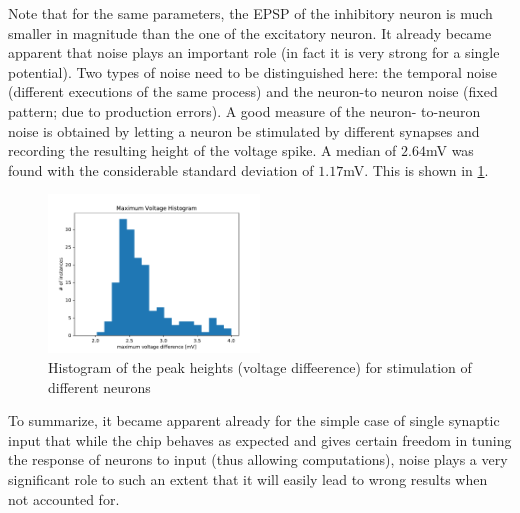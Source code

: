 \documentclass[a4paper,twocolumn]{article}
\begin{document}
Note that for the same parameters,  the EPSP of the inhibitory neuron is much
smaller in magnitude than the one of the excitatory neuron.
It already became apparent that noise plays an important role (in fact it is very
strong for a single potential).  Two types of noise need to be distinguished here:
the temporal noise (different executions of the same process) and the neuron-to
neuron noise (fixed pattern; due to production errors).  A good measure of the neuron-
to-neuron noise is obtained by letting a neuron be stimulated by different synapses
and recording the resulting height of the voltage spike.  A median of $2.64$mV was
found with the considerable standard deviation of $1.17$mV.  This is shown in
\ref{MaxVoltHisto}.
\begin{figure}
		\includegraphics[width=0.5\textwidth]{figures/histo_maxVolt.pdf}
		\caption{Histogram of the peak heights (voltage diffeerence) for stimulation
		of different neurons}
		\label{MaxVoltHisto}
\end{figure}
To summarize,  it became apparent already for the simple case of single synaptic
input that while the chip behaves as expected and gives certain freedom in tuning
the response of neurons to input (thus allowing computations),  noise plays a very
significant role to such an extent that it will easily lead to wrong results when not
accounted for.
\end{document}
